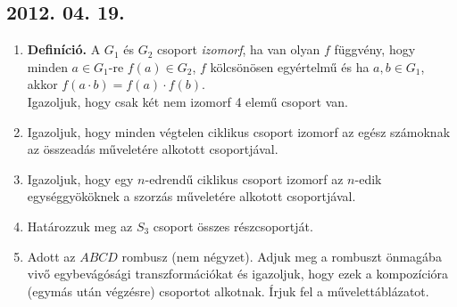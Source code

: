 \documentclass{article}
\begin{document}
\subsection*{2012. 04. 19.}
\begin{enumerate}
\item \textbf{Definíció.} A $G_1$ és $G_2$ csoport \emph{izomorf}, ha van olyan $f$ függvény, hogy minden $a\in G_1$-re $f(a)\in G_2$, $f$ kölcsönösen egyértelmű és ha $a,b\in G_1$, akkor $f(a\cdot b)=f(a)\cdot f(b)$.\\
Igazoljuk, hogy csak két nem izomorf 4 elemű csoport van.
\item Igazoljuk, hogy minden végtelen ciklikus csoport izomorf az egész számoknak az összeadás műveletére alkotott csoportjával.
\item Igazoljuk, hogy egy $n$-edrendű ciklikus csoport izomorf az $n$-edik egységgyököknek a szorzás műveletére alkotott csoportjával.
\item Határozzuk meg az $S_3$ csoport összes részcsoportját.
\item Adott az $ABCD$ rombusz (nem négyzet). Adjuk meg a rombuszt önmagába vivő egybevágósági transzformációkat és igazoljuk, hogy ezek a kompozícióra (egymás után végzésre) csoportot alkotnak. Írjuk fel a művelettáblázatot.
\end{enumerate}
\end{document}
